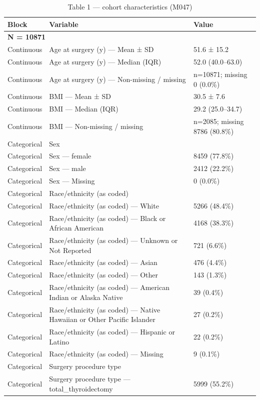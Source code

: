 \begin{table}[htbp]
\centering
\caption{Table 1 — cohort characteristics (M047)}
\label{tab:table1\_m047}
\begin{tabular}{lll}
\toprule
Block & Variable & Value \\
\midrule
\multicolumn{3}{l}{\textbf{N = 10871}} \\
Continuous & Age at surgery (y) — Mean ± SD & 51.6 ± 15.2 \\
Continuous & Age at surgery (y) — Median (IQR) & 52.0 (40.0–63.0) \\
Continuous & Age at surgery (y) — Non-missing / missing & n=10871; missing 0 (0.0\%) \\
Continuous & BMI — Mean ± SD & 30.5 ± 7.6 \\
Continuous & BMI — Median (IQR) & 29.2 (25.0–34.7) \\
Continuous & BMI — Non-missing / missing & n=2085; missing 8786 (80.8\%) \\
Categorical & Sex &  \\
Categorical & Sex — female & 8459 (77.8\%) \\
Categorical & Sex — male & 2412 (22.2\%) \\
Categorical & Sex — Missing & 0 (0.0\%) \\
Categorical & Race/ethnicity (as coded) &  \\
Categorical & Race/ethnicity (as coded) — White & 5266 (48.4\%) \\
Categorical & Race/ethnicity (as coded) — Black or African American & 4168 (38.3\%) \\
Categorical & Race/ethnicity (as coded) — Unknown or Not Reported & 721 (6.6\%) \\
Categorical & Race/ethnicity (as coded) — Asian & 476 (4.4\%) \\
Categorical & Race/ethnicity (as coded) — Other & 143 (1.3\%) \\
Categorical & Race/ethnicity (as coded) — American Indian or Alaska Native & 39 (0.4\%) \\
Categorical & Race/ethnicity (as coded) — Native Hawaiian or Other Pacific Islander & 27 (0.2\%) \\
Categorical & Race/ethnicity (as coded) — Hispanic or Latino & 22 (0.2\%) \\
Categorical & Race/ethnicity (as coded) — Missing & 9 (0.1\%) \\
Categorical & Surgery procedure type &  \\
Categorical & Surgery procedure type — total\_thyroidectomy & 5999 (55.2\%) \\

\end{tabular}
\end{table}
